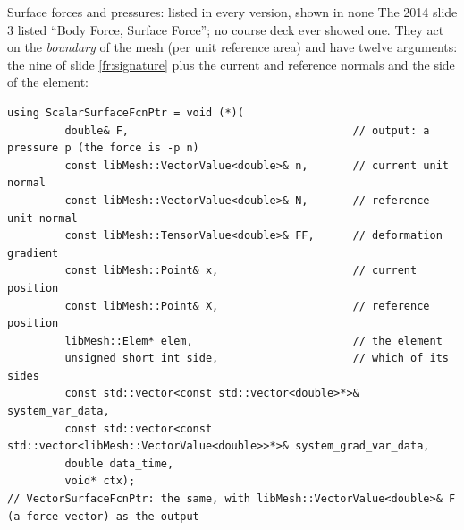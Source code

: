 \documentclass[aspectratio=169,11pt]{beamer}
\begin{document}
\begin{frame}[fragile]{Surface forces and pressures: listed in every version, shown in none}
\label{fr:surface}
\footnotesize
The 2014 slide 3 listed ``Body Force, Surface Force''; no course deck ever showed one. They act on the \emph{boundary} of the mesh (per unit reference area) and have twelve arguments: the nine of slide \ref{fr:signature} plus the current and reference normals and the side of the element:
\begin{lstlisting}[style=cpptiny]
using ScalarSurfaceFcnPtr = void (*)(
         double& F,                                   // output: a pressure p (the force is -p n)
         const libMesh::VectorValue<double>& n,       // current unit normal
         const libMesh::VectorValue<double>& N,       // reference unit normal
         const libMesh::TensorValue<double>& FF,      // deformation gradient
         const libMesh::Point& x,                     // current position
         const libMesh::Point& X,                     // reference position
         libMesh::Elem* elem,                         // the element
         unsigned short int side,                     // which of its sides
         const std::vector<const std::vector<double>*>& system_var_data,
         const std::vector<const std::vector<libMesh::VectorValue<double>>*>& system_grad_var_data,
         double data_time,
         void* ctx);
// VectorSurfaceFcnPtr: the same, with libMesh::VectorValue<double>& F (a force vector) as the output
\end{lstlisting}
\end{frame}
\end{document}
